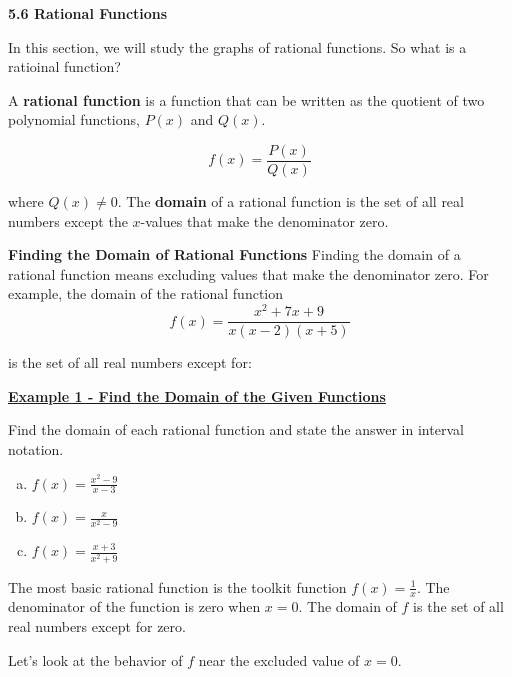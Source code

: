 \documentclass[12pt]{book}
\newcommand{\D}{\displaystyle}
\begin{document}
{\Large \textbf{5.6 Rational Functions}}


In this section, we will study the graphs of rational functions. So what is a ratioinal function?

\begin{boxR}
    A \textbf{rational function} is a function that can be written as the quotient of two polynomial functions, $P(x)$ and $Q(x)$. 

    $$f(x) = \frac{P(x)}{Q(x)}$$

    where $Q(x) \neq 0$. The \textbf{domain} of a rational function is the set of all real numbers except the $x$-values that make the denominator zero. 
\end{boxR}


\textbf{{\large Finding the Domain of Rational Functions}}
Finding the domain of a rational function means excluding values that make the denominator zero. For example, the domain of the rational function $$ f(x) = \frac{x^2+7x+9}{x(x-2)(x+5)}$$
\vspace{2mm}

is the set of all real numbers except for: \underline{\hspace{25mm}}
\vspace{2mm}

\underline{\textbf{Example 1 - Find the Domain of the Given Functions}}

Find the domain of each rational function and state the answer in interval notation. 
\vspace{2mm}
    \begin{enumerate}[(a)]
        \item $\D f(x)= \frac{x^2-9}{x-3}$
            \vspace{25mm}
        \item $\D f(x)= \frac{x}{x^2-9}$
            \vspace{25mm}
        \item $\D f(x)= \frac{x+3}{x^2+9}$
            \vspace{25mm}
    \end{enumerate}


\newpage
The most basic rational function is the toolkit function $\D f(x)= \frac{1}{x}$. The denominator of the function is zero when $x=0$. The domain of $f$ is the set of all real numbers except for zero. 

Let's look at the behavior of $f$ near the excluded value of $x=0$. 
\end{document}
